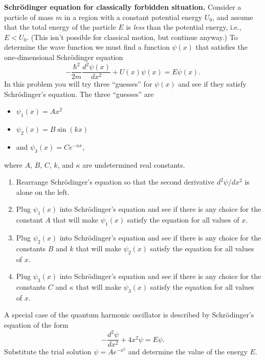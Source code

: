 
\begin{problem}
{\bf Schr\"{o}dinger equation for classically forbidden
situation.}  Consider a particle of mass $m$ in a region with a
constant potential energy $U_0$, and assume that the total energy of
the particle $E$ is {\em less} than the potential energy,
i.e., $E<U_0$.  (This isn't possible for classical motion, but continue
anyway.)  To determine the wave function we must find a function
$\psi(x)$ that satisfies the one-dimensional Schr\"{o}dinger equation
\[ -\frac{\hbar^2}{2m} \frac{d^2\psi(x)}{dx^2} + U(x)\psi(x) 
= E\psi(x).  \]
In this problem you will try three ``guesses'' for $\psi(x)$ 
and see if they satisfy Schr\"{o}dinger's equation. The 
three ``guesses'' are 
\begin{itemize}
\item $\psi_1(x) = Ax^2$ 
\item $\psi_2(x) = B\sin(kx)$
\item and $\psi_3(x) = Ce^{-\kappa x}$,
\end{itemize}
where $A$, $B$, $C$, $k$, and $\kappa$ are undetermined real
constants.
    \begin{enumerate}
    \item Rearrange Schr\"{o}dinger's equation so that the
    second derivative $d^2\psi/dx^2$ is alone on the left.
    \item Plug $\psi_1(x)$ into Schr\"{o}dinger's equation and 
    see if there is any choice for the constant $A$ that will
    make $\psi_1(x)$ satisfy the equation for all values of $x$.
    \item Plug $\psi_2(x)$ into Schr\"{o}dinger's equation and see
    if there is any choice for the constants $B$ and $k$ that will
    make $\psi_2(x)$ satisfy the equation for all values of $x$.  
    \item  Plug $\psi_3(x)$ into Schr\"{o}dinger's equation and see
    if there is any choice for the constants $C$ and $\kappa$ that will
    make $\psi_3(x)$ satisfy the equation for all values of $x$. 
    \end{enumerate} 
\end{problem}


\begin{problem}
A special case of the quantum harmonic oscillator is described by 
Schr\"{o}dinger's equation of the form
\[ -\frac{d^2\psi}{dx^2} + 4x^2 \psi = E\psi.  \]
Substitute the trial solution $\psi = Ae^{-x^2}$ and determine the value 
of the energy $E$.
\label{prob:harmonic_oscillator}
\end{problem}

